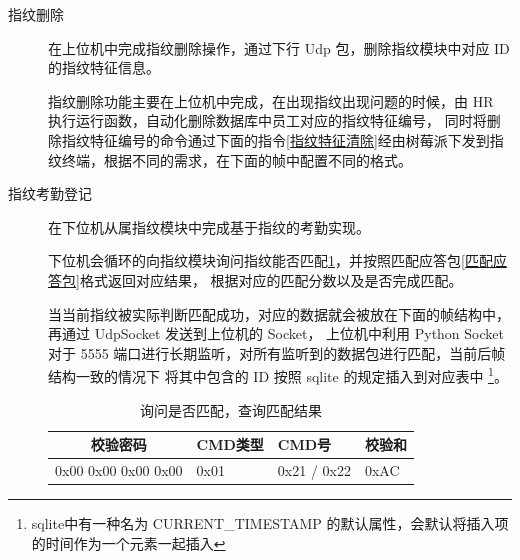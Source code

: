 \begin{description}
        \item[指纹删除] 在上位机中完成指纹删除操作，通过下行 Udp 包，删除指纹模块中对应 ID 的指纹特征信息。
        
        指纹删除功能主要在上位机中完成，在出现指纹出现问题的时候，由 HR 执行运行函数，自动化删除数据库中员工对应的指纹特征编号，
        同时将删除指纹特征编号的命令通过下面的指令\ref{指纹特征清除}经由树莓派下发到指纹终端，根据不同的需求，在下面的帧中配置不同的格式。

        \begin{table}[H]
            \caption{指纹特征清除} \label{指纹特征清除}
        \end{table}

        \item[指纹考勤登记] 在下位机从属指纹模块中完成基于指纹的考勤实现。
        
        下位机会循环的向指纹模块询问指纹能否匹配\ref{询问是否匹配}，并按照匹配应答包\ref{匹配应答包}格式返回对应结果，
        根据对应的匹配分数以及是否完成匹配。

        当当前指纹被实际判断匹配成功，对应的数据就会被放在下面的帧结构中，再通过 UdpSocket 发送到上位机的 Socket，
        上位机中利用 Python Socket 对于 5555 端口进行长期监听，对所有监听到的数据包进行匹配，当前后帧结构一致的情况下
        将其中包含的 ID 按照 sqlite 的规定插入到对应表中
        \footnote{sqlite中有一种名为 CURRENT\_TIMESTAMP 的默认属性，会默认将插入项的时间作为一个元素一起插入}。

        \begin{table}[H]
            \centering
            \caption{询问是否匹配，查询匹配结果} \label{询问是否匹配}
            \begin{tabular}{llll}
            \hline
            \multicolumn{1}{c}{校验密码} & CMD类型 & CMD号    & 校验和  \\ \hline
            0x00 0x00 0x00 0x00        & 0x01  & 0x21 / 0x22 & 0xAC \\ \hline
            \end{tabular}
        \end{table}


\end{description}
